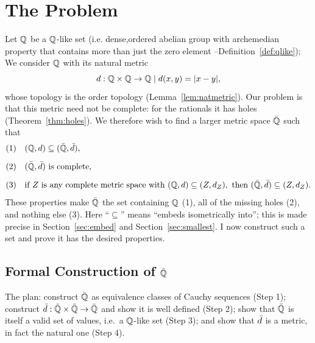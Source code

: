 \newpage


\section{The Problem}

Let $\mathbb{Q}$ be a $\mathbb{Q}$-like set (i.e. dense,ordered abelian group with archemedian property that contains more than just the zero element --Definition~\ref{def:qlike}); We consider $\mathbb{Q}$ with its natural metric
\[ d: \mathbb{Q} \times \mathbb{Q} \to \mathbb{Q} \mid d(x,y) = |x-y|, \]
whose topology is the order topology (Lemma~\ref{lem:natmetric}). Our problem
is that this metric need not be complete: for the rationals it has holes
(Theorem~\ref{thm:holes}). We therefore wish to find a larger metric space
$\bar{\mathbb{Q}}$ such that
\[
\begin{aligned}
(1)\quad & (\mathbb{Q},d) \subseteq (\bar{\mathbb{Q}},\bar{d}),\\[2mm]
(2)\quad & (\bar{\mathbb{Q}},\bar{d})\ \text{is complete},\\[2mm]
(3)\quad & \text{if } Z \text{ is any complete metric space with }
(\mathbb{Q},d)\subseteq (Z,d_Z),\text{ then } (\bar{\mathbb{Q}},\bar{d})\subseteq (Z,d_Z).
\end{aligned}
\]
These properties make $\bar{\mathbb{Q}}$ the set containing $\mathbb{Q}$ (1), all of the missing
holes (2), and nothing else (3). Here ``$\subseteq$'' means ``embeds
isometrically into''; this is made precise in Section~\ref{sec:embed} and
Section~\ref{sec:smallest}. I now construct such a set and prove it has the
desired properties.



\subsection{Formal Construction of $\bar{\mathbb{Q}}$} \label{sec:construct}

The plan: construct $\bar{\mathbb{Q}}$ as equivalence classes of Cauchy sequences
(Step 1); construct $\bar{d}:\bar{\mathbb{Q}}\times\bar{\mathbb{Q}}\to\bar{\mathbb{Q}}$ and show it is well defined
(Step 2); show that $\bar{\mathbb{Q}}$ is itself a valid set of values, i.e.\ a $\mathbb{Q}$-like
set (Step 3); and show that $\bar{d}$ is a metric, in fact the natural one
(Step 4).


